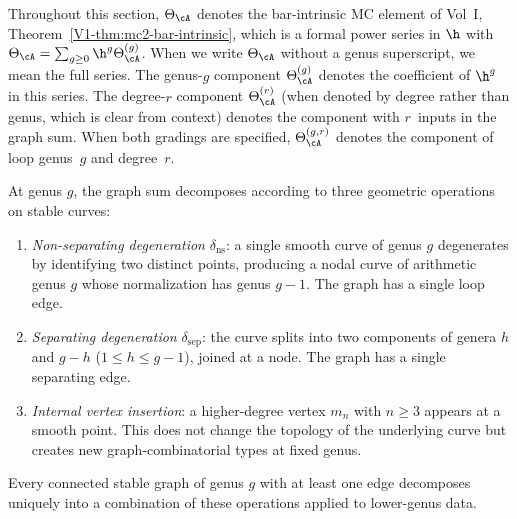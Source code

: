 \begin{remark}
Throughout this section, $\Theta_\cA$ denotes the bar-intrinsic MC element
of Vol~I, Theorem~\ref*{V1-thm:mc2-bar-intrinsic}, which is a formal
power series in $\h$ with $\Theta_\cA = \sum_{g \geq 0} \h^g
\Theta_\cA^{(g)}$. When we write $\Theta_\cA$ without a genus
superscript, we mean the full series. The genus-$g$ component
$\Theta_\cA^{(g)}$ denotes the coefficient of $\h^g$ in this series.
The degree-$r$ component $\Theta_\cA^{(r)}$ (when denoted by degree
rather than genus, which is clear from context) denotes the component
with $r$~inputs in the graph sum. When both gradings are specified,
$\Theta_\cA^{(g,r)}$ denotes the component of loop genus~$g$ and
degree~$r$.
\end{remark}

\begin{remark}
At genus $g$, the graph sum decomposes according to three geometric operations on
stable curves:
\begin{enumerate}[label=\textup{(\alph*)}]
\item \emph{Non-separating degeneration} $\delta_{\mathrm{ns}}$: a single smooth curve
 of genus $g$ degenerates by identifying two distinct points, producing a nodal curve
 of arithmetic genus $g$ whose normalization has genus $g-1$. The graph has a single
 loop edge.
\item \emph{Separating degeneration} $\delta_{\mathrm{sep}}$: the curve splits into two
 components of genera $h$ and $g-h$ ($1 \leq h \leq g-1$), joined at a node. The
 graph has a single separating edge.
\item \emph{Internal vertex insertion}: a higher-degree vertex $m_n$ with $n \geq 3$
 appears at a smooth point. This does not change the topology of the underlying
 curve but creates new graph-combinatorial types at fixed genus.
\end{enumerate}
Every connected stable graph of genus $g$ with at least one edge decomposes uniquely
into a combination of these operations applied to lower-genus data.
\end{remark}

